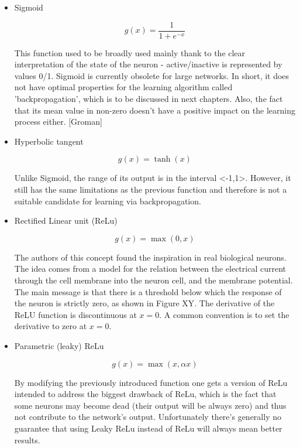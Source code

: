 \begin{itemize}

\item Sigmoid

$$  
g(x)=\frac{1}{1 + e^{-x}}
$$

This function used to be broadly used mainly thank to the clear interpretation of the state of the neuron - active/inactive is represented by values 0/1. Sigmoid is currently obsolete for large networks. In short, it does not have optimal properties for the learning algorithm called 'backpropagation', which is to be discussed in next chapters. Also, the fact that its mean value in non-zero doesn't have a positive impact on the learning process either. [Groman]

\item Hyperbolic tangent 

$$  
g(x)=\tanh (x)
$$

Unlike Sigmoid, the range of its output is in the interval <-1,1>. However, it still has the same limitations as the previous function and therefore is not a suitable candidate for learning via backpropagation. 

\item Rectified Linear unit (ReLu)

$$
g(x)=\max (0,x)
$$

The authors of this concept found the inspiration in real biological neurons. The idea comes from a model for the relation between the electrical current through the cell membrane into the neuron cell, and the membrane potential. The main message is that there is a threshold below which the response of the neuron is strictly zero, as shown in Figure XY. The derivative of the ReLU function is discontinuous at $ x=0 $. A common convention is to set the derivative to zero at $ x=0 $.  

\item Parametric (leaky) ReLu

$$
g(x)=\max(x,\alpha x)
$$

By modifying the previously introduced function one gets a version of ReLu intended to address the biggest drawback of ReLu, which is the fact that some neurons may become dead (their output will be always zero) and thus not contribute to the network's output. Unfortunately there's generally no guarantee that using Leaky ReLu instead of ReLu will always mean better results. 

\end{itemize}

 




